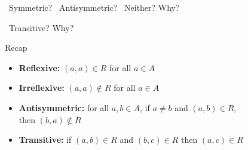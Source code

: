 \documentclass[a4paper,12pt]{book}
\newcounter{question}
\begin{document}
\begin{questionNOGRADE}{\thequestion}
        \Square\ Symmetric? \tab
        \Square\ Antisymmetric? \tab
        \Square\ Neither? \tab Why?

        \Square\ Transitive? \tab Why?

    \end{questionNOGRADE}

\newpage

    \begin{intro}{Recap}
        \begin{itemize}
            \item   \textbf{Reflexive:}         $(a,a) \in R$ for all $a \in A$
            \item   \textbf{Irreflexive:}       $(a,a) \not\in R$ for all $a \in A$
            \item   \textbf{Antisymmetric:}     for all $a,b \in A$, if $a \neq b$ and $(a,b) \in R$, \\ then $(b,a) \not\in R$
            \item   \textbf{Transitive:}        if $(a,b) \in R$ and $(b,c) \in R$ then $(a,c) \in R$
        \end{itemize}
    \end{intro}
\end{document}
